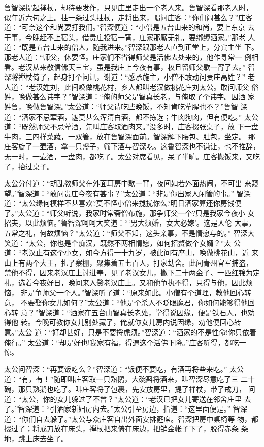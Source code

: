 鲁智深提起禅杖，却待要发作，只见庄里走出一个老人来。鲁智深看那老人时，
似年近六旬之上。拄一条过头拄杖，走将出来，喝问庄客：“你们闹甚么？”庄客
道：“可奈这个和尚要打我们。”智深便道：“小僧是五台山来的和尚，要上东京
去干事，今晚赶不上宿头，借贵庄投宿一宵，庄家那厮无礼，要绑缚洒家。”那老
人道：“既是五台山来的僧人，随我进来。”智深跟那老人直到正堂上，分宾主坐
下。那老人道：“师父，休要怪。庄家们不省得师父是活佛去处来的，他作寻常一
例相看。老汉从来敬信佛天三宝，虽是我庄上今夜有事，权且留师父歇一宵了去。”
智深将禅杖倚了，起身打个问讯，谢道：“感承施主，小僧不敢动问贵庄高姓？”
老人道：“老汉姓刘，此间唤做桃花村，乡人都叫老汉做桃花庄刘太公。敢问师父
俗姓，唤做甚么讳字？”智深道：“俺的师父是智真长老，与俺取了个讳字。因洒
家姓鲁，唤做鲁智深。”太公道：“师父请吃些晚饭，不知肯吃荤腥也不？”鲁智
深道：“洒家不忌荤酒，遮莫甚么浑清白酒，都不拣选；牛肉狗肉，但有便吃。”
太公道：“既然师父不忌荤酒，先叫庄客取酒肉来。”没多时，庄客掇张桌子，放
下一盘牛肉，三四样菜蔬，一双箸，放在鲁智深面前。智深解下腰包、肚包，坐定。
那庄客旋了一壶酒，拿一只盏子，筛下酒与智深吃。这鲁智深也不谦让，也不推辞，
无一时，一壶酒，一盘肉，都吃了。太公对席看见，呆了半晌。庄客搬饭来，又吃
了，抬过桌子。

太公分付道：“胡乱教师父在外面耳房中歇一宵，夜间如若外面热闹，不可出
来窥望。”智深道：“敢问贵庄今夜有甚事？”太公道：“非是你出家人闲管的事。”
智深道：“太公缘何模样不甚喜欢?莫不怪小僧来搅扰你么?明日洒家算还你房钱便
了。”太公道：“师父听说，我家时常斋僧布施，那争师父一个?只是我家今夜小
女招夫，以此烦恼。”鲁智深呵呵大笑道：“‘男大须婚，女大必嫁’。这是人伦
大事，五常之礼，何故烦恼？”太公道：“师父不知，这头亲事，不是情愿与的。”
智深大笑道：“太公，你也是个痴汉，既然不两相情愿，如何招赘做个女婿？”太
公道：“老汉止有这个小女，如今方得一十九岁，被此间有座山，唤做桃花山，近
来山上有两个大王，扎了寨栅，聚集着五七百人，打家劫舍。此间青州官军捕盗，
禁他不得，因来老汉庄上讨进奉，见了老汉女儿，撇下二十两金子、一匹红锦为定
礼，选着今夜好日，晚间来入赘老汉庄上。又和他争执不得，只得与他，因此烦恼，
非是争师父一个人。”智深听了道：“原来如此。小僧有个道理，教他回心转意，
不要娶你女儿如何？”太公道：“他是个杀人不眨眼魔君，你如何能够得他回心转
意？”智深道：“洒家在五台山智真长老处，学得说因缘，便是铁石人，也劝得他
转。今晚可教你女儿别处藏了，俺就你女儿房内说因缘，劝他便回心转意。”太公
道：“好却甚好，只是不要捋虎须。”智深道：“洒家的不是性命!你只依着俺行。”
太公道：“却是好也!我家有福，得遇这个活佛下降。”庄客听得，都吃一惊。

太公问智深：“再要饭吃么？”智深道：“饭便不要吃，有酒再将些来吃。”
太公道：“有，有！”随即叫庄客取一只熟鹅，大碗斟将酒来，叫智深尽意吃了三
二十碗，那只熟鹅也吃了。叫庄客将了包裹，先安放房里，提了禅杖，带了戒刀，
问道：“太公，你的女儿躲过了不曾？”太公道：“老汉已把女儿寄送在邻舍庄里
去了。”智深道：“引洒家新妇房内去。”太公引至房边，指道：“这里面便是。”
智深道：“你们自去躲了。”太公与众庄客自出外面安排筵席。智深把房中桌椅等
物，都掇过了；将戒刀放在床头，禅杖把来倚在床边，把销金帐子下了，脱得赤条
条地，跳上床去坐了。

